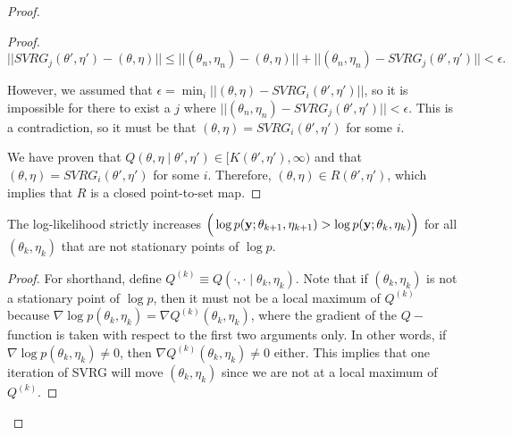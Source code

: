 \begin{proof}
\begin{proof}
    $$||SVRG_j(\theta',\eta') - (\theta,\eta)|| \leq ||(\theta_{n},\eta_{n}) - (\theta,\eta)|| + ||(\theta_{n},\eta_{n}) - SVRG_j(\theta',\eta')|| < \epsilon.$$
    
    However, we assumed that $\epsilon = \min_i ||(\theta,\eta) - SVRG_i(\theta',\eta')||$, so it is impossible for there to exist a $j$ where $||(\theta_{n},\eta_{n}) - SVRG_j(\theta',\eta')|| < \epsilon$. This is a contradiction, so it must be that $(\theta,\eta) = SVRG_i(\theta',\eta')$ for some $i$.
    
    We have proven that $Q(\theta, \eta \mid \theta', \eta') \in [K(\theta',\eta'),\infty)$ and that $(\theta,\eta) = SVRG_i(\theta',\eta')$ for some $i$. Therefore, $(\theta,\eta) \in R(\theta',\eta')$, which implies that $R$ is a closed point-to-set map.
\end{proof}

\begin{lemma}
    The log-likelihood strictly increases $\Big(\log p(\mathbf{y};\theta_{k+1},\eta_{k+1}) > \log p(\mathbf{y};\theta_k,\eta_k)\Big)$ for all $(\theta_k,\eta_k)$ that are not stationary points of $\log p$.
\end{lemma}

\begin{proof}

For shorthand, define $Q^{(k)} \equiv Q(\cdot,\cdot \mid \theta_k,\eta_k)$. Note that if $(\theta_k,\eta_k)$ is not a stationary point of $\log p$, then it must not be a local maximum of $Q^{(k)}$ because $\nabla \log p(\theta_k,\eta_k) = \nabla Q^{(k)}(\theta_k,\eta_k)$, where the gradient of the $Q-$ function is taken with respect to the first two arguments only. In other words, if $\nabla \log p(\theta_k,\eta_k) \neq 0$, then $\nabla Q^{(k)}(\theta_k,\eta_k) \neq 0$ either. This implies that one iteration of SVRG will move $(\theta_k,\eta_k)$ since we are not at a local maximum of $Q^{(k)}$.


\end{proof}
\end{proof}
